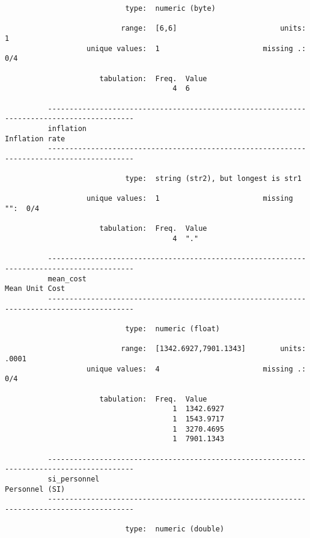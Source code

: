 \documentclass{article}
\begin{document}
\begin{verbatim}
                            type:  numeric (byte)
          
                           range:  [6,6]                        units:  1
                   unique values:  1                        missing .:  0/4
          
                      tabulation:  Freq.  Value
                                       4  6
          
          ------------------------------------------------------------------------------------------
          inflation                                                                   Inflation rate
          ------------------------------------------------------------------------------------------
          
                            type:  string (str2), but longest is str1
          
                   unique values:  1                        missing "":  0/4
          
                      tabulation:  Freq.  Value
                                       4  "."
          
          ------------------------------------------------------------------------------------------
          mean_cost                                                                   Mean Unit Cost
          ------------------------------------------------------------------------------------------
          
                            type:  numeric (float)
          
                           range:  [1342.6927,7901.1343]        units:  .0001
                   unique values:  4                        missing .:  0/4
          
                      tabulation:  Freq.  Value
                                       1  1342.6927
                                       1  1543.9717
                                       1  3270.4695
                                       1  7901.1343
          
          ------------------------------------------------------------------------------------------
          si_personnel                                                                Personnel (SI)
          ------------------------------------------------------------------------------------------
          
                            type:  numeric (double)
          

\end{verbatim}
\end{document}
